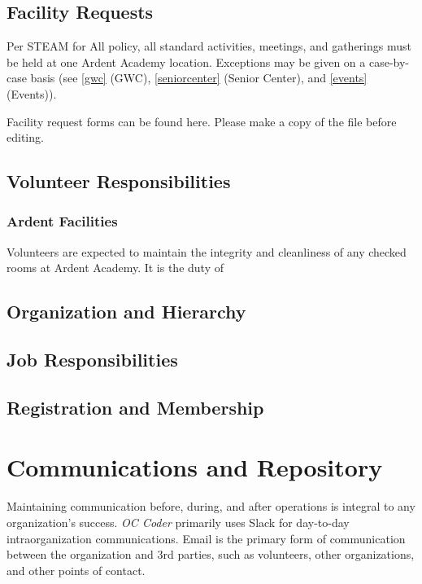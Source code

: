 \documentclass[twoside,11pt,letterpaper,abstracton]{scrartcl}
\begin{document}
\subsection{Facility Requests}

Per STEAM for All policy, all standard activities, meetings, and gatherings must be held at one Ardent Academy location. Exceptions may be given on a case-by-case basis (see \ref{gwc} (GWC), \ref{seniorcenter} (Senior Center), and \ref{events} (Events)).

Facility request forms can be found here. Please make a copy of the file before editing.

\subsection{Volunteer Responsibilities}

\subsubsection{Ardent Facilities}

Volunteers are expected to maintain the integrity and cleanliness of any checked rooms at Ardent Academy. It is the duty of 

\subsection{Organization and Hierarchy}

\subsection{Job Responsibilities}

\subsection{Registration and Membership}

\newpage

\section{Communications and Repository}

Maintaining communication before, during, and after operations is integral to any organization's success. \emph{OC Coder} primarily uses Slack for day-to-day intraorganization communications. Email is the primary form of communication between the organization and 3rd parties, such as volunteers, other organizations, and other points of contact. 
\end{document}
